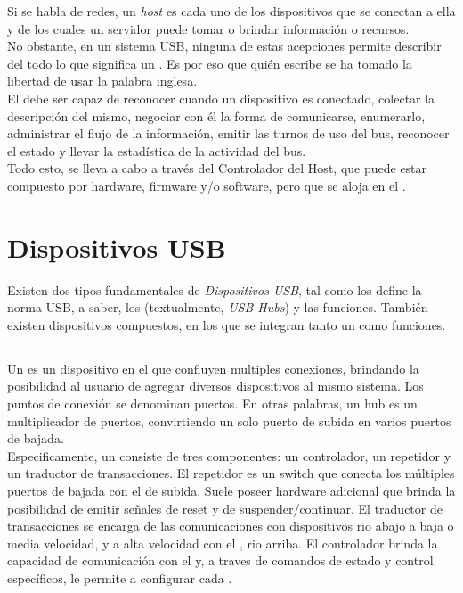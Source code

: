   Si se habla de redes, un {\it host} es cada uno de los dispositivos que se
  conectan a ella y de los cuales un servidor puede tomar o brindar información
  o recursos.\\

  No obstante, en un sistema USB, ninguna de estas acepciones permite describir
  del todo lo que significa un \host. Es por eso que quién escribe se ha tomado
  la libertad de usar la palabra inglesa.\\

  El \host debe ser capaz de reconocer cuando un dispositivo es conectado,
  colectar la descripción del mismo, negociar con él la forma de comunicarse,
  enumerarlo, administrar el flujo de la información, emitir las turnos de uso
  del bus, reconocer el estado y llevar la estadística de la actividad del
  bus.\\

  Todo esto, se lleva a cabo a través del Controlador del Host, que puede estar
  compuesto por hardware, firmware y/o software, pero que se aloja en el
  \host.\\

  \section{Dispositivos USB}
  Existen dos tipos fundamentales de {\it Dispositivos USB}, tal como los define
  la norma USB, a saber, los \hubs (textualmente, {\it USB Hubs}) y
  las funciones. También existen dispositivos compuestos, en los que se integran
  tanto un \hub como funciones.\\

  \subsection{\Hub}
  Un \hub es un dispositivo en el que confluyen multiples conexiones, brindando
  la posibilidad al usuario de agregar diversos dispositivos al mismo sistema.
  Los puntos de conexión se denominan puertos. En otras palabras, un hub es
  un multiplicador de puertos, convirtiendo un solo puerto de subida en varios
  puertos de bajada.\\

  Especificamente, un  consiste de tres componentes: un controlador, un
  repetidor y un traductor de transacciones. El repetidor es un switch que
  conecta los múltiples puertos de bajada con el de subida. Suele poseer
  hardware adicional que brinda la posibilidad de emitir señales de reset y de
  suspender/continuar. El traductor de transacciones se encarga de las
  comunicaciones con dispositivos rio abajo a baja o media velocidad, y a alta
  velocidad con el \host, rio arriba. El controlador brinda la capacidad de
  comunicación con el \host y, a traves de comandos de estado y control
  específicos, le permite a \host configurar cada \hub.\\

